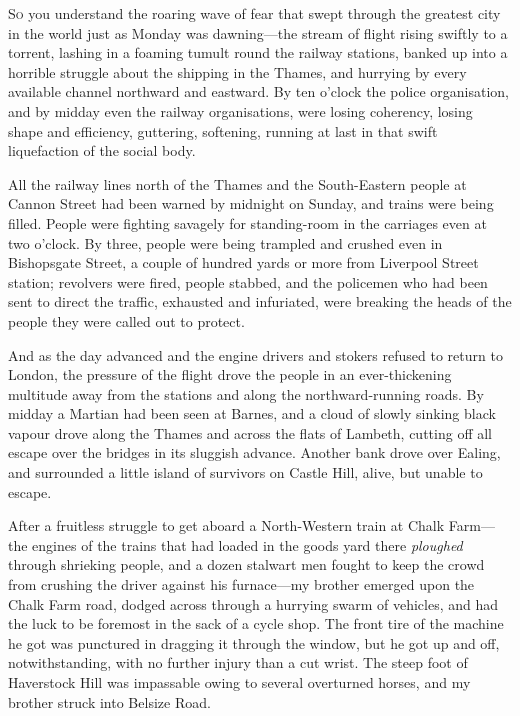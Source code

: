 



\lettrine[lines=4,findent=2pt]{S}{o} you understand the roaring wave of fear that swept through the greatest city in the world just as Monday was dawning—the stream of flight rising swiftly to a torrent, lashing in a foaming tumult round the railway stations, banked up into a horrible struggle about the shipping in the Thames, and hurrying by every available channel northward and eastward. By ten o'clock the police organisation, and by midday even the railway organisations, were losing coherency, losing shape and efficiency, guttering, softening, running at last in that swift liquefaction of the social body.

All the railway lines north of the Thames and the South-Eastern people at Cannon Street had been warned by midnight on Sunday, and trains were being filled. People were fighting savagely for standing-room in the carriages even at two o'clock. By three, people were being trampled and crushed even in Bishopsgate Street, a couple of hundred yards or more from Liverpool Street station; revolvers were fired, people stabbed, and the policemen who had been sent to direct the traffic, exhausted and infuriated, were breaking the heads of the people they were called out to protect.

And as the day advanced and the engine drivers and stokers refused to return to London, the pressure of the flight drove the people in an ever-thickening multitude away from the stations and along the northward-running roads. By midday a Martian had been seen at Barnes, and a cloud of slowly sinking black vapour drove along the Thames and across the flats of Lambeth, cutting off all escape over the bridges in its sluggish advance. Another bank drove over Ealing, and surrounded a little island of survivors on Castle Hill, alive, but unable to escape.

After a fruitless struggle to get aboard a North-Western train at Chalk Farm—the engines \label{brojourney6} of the trains that had loaded in the goods yard there \textit{ploughed} through shrieking people, and a dozen stalwart men fought to keep the crowd from crushing the driver against his furnace—my brother emerged upon the Chalk Farm road, dodged across through a hurrying swarm of vehicles, and had the luck to be foremost in the sack of a cycle shop. The front tire of the machine he got was punctured in dragging it through the window, but he got up and off, notwithstanding, with no further injury than a cut wrist. The steep foot of Haverstock Hill was impassable owing to several overturned horses, and my brother struck into Belsize Road.\label{brojourney7}

